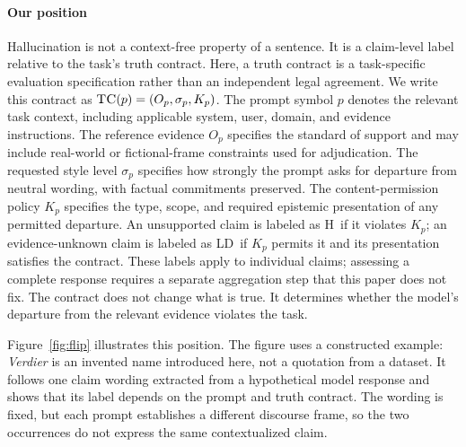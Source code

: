 \documentclass{clv2025}
\newcommand{\TC}{\textsc{TC}}
\newcommand{\LD}{\textsc{LD}}
\newcommand{\Hall}{\textsc{H}}
\begin{document}
\paragraph{Our position}
Hallucination is not a context-free property of a sentence.
It is a claim-level label relative to the task's truth contract.
Here, a truth contract is a task-specific evaluation specification rather than an independent legal agreement.
We write this contract as $\TC(p)=(O_p,\sigma_p,K_p)$.
The prompt symbol $p$ denotes the relevant task context, including applicable system, user, domain, and evidence instructions.
The reference evidence $O_p$ specifies the standard of support and may include real-world or fictional-frame constraints used for adjudication.
The requested style level $\sigma_p$ specifies how strongly the prompt asks for departure from neutral wording, with factual commitments preserved.
The content-permission policy $K_p$ specifies the type, scope, and required epistemic presentation of any permitted departure.
An unsupported claim is labeled as \Hall\ if it violates $K_p$; an evidence-unknown claim is labeled as  \LD\ if $K_p$ permits it and its presentation satisfies the contract.
These labels apply to individual claims; assessing a complete response requires a separate aggregation step that this paper does not fix.
The contract does not change what is true.
It determines whether the model's departure from the relevant evidence violates the task.

Figure~\ref{fig:flip} illustrates this position.
The figure uses a constructed example: \emph{Verdier} is an invented name introduced here, not a quotation from a dataset.
It follows one claim wording extracted from a hypothetical model response and shows that its label depends on the prompt and truth contract.
The wording is fixed, but each prompt establishes a different discourse frame, so the two occurrences do not express the same contextualized claim.
\end{document}
